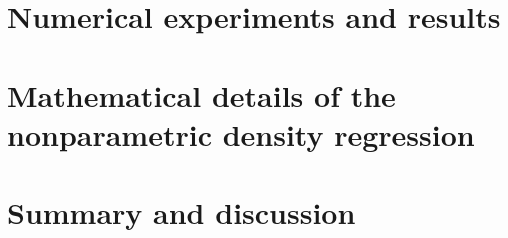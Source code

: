 \documentclass[\ifafour a4paper,12pt,\else a5paper,10pt,\fi%
onecolumn,oneside,article,%
british%
]{memoir}
\makeatletter
\theoremstyle{remark}
\theoremstyle{innote}
\def\sum{\DOTSI\sumop\slimits@}
\newcommand*{\de}{\partialup}%
\newcommand*{\p}{\mathrm{p}}%
\renewcommand*{\|}[1][]{\nonscript\:#1\vert\nonscript\:\mathopen{}}
\newcommand*{\tsum}{\mathop{\textstyle\sum}\nolimits}
\makeatother
\begin{document}
\section{Numerical experiments and results}
\label{sec:results}


\section{Mathematical details of the nonparametric density regression}
\label{sec:nonparam_regression_details}


\section{Summary and discussion}
\label{sec:summary_discussion}


\clearpage




\end{document}
